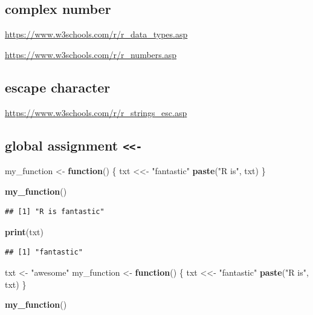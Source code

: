 \documentclass[
]{book}
\newenvironment{Shaded}{\begin{snugshade}}{\end{snugshade}}
\newcommand{\ControlFlowTok}[1]{\textcolor[rgb]{0.13,0.29,0.53}{\textbf{#1}}}
\newcommand{\FunctionTok}[1]{\textcolor[rgb]{0.13,0.29,0.53}{\textbf{#1}}}
\newcommand{\NormalTok}[1]{#1}
\newcommand{\OtherTok}[1]{\textcolor[rgb]{0.56,0.35,0.01}{#1}}
\newcommand{\StringTok}[1]{\textcolor[rgb]{0.31,0.60,0.02}{#1}}
\theoremstyle{definition}
\theoremstyle{definition}
\theoremstyle{definition}
\theoremstyle{definition}
\theoremstyle{remark}
\begin{document}
\subsection{complex number}\label{complex-number}

\url{https://www.w3schools.com/r/r_data_types.asp}

\url{https://www.w3schools.com/r/r_numbers.asp}

\subsection{escape character}\label{escape-character}

\url{https://www.w3schools.com/r/r_strings_esc.asp}

\subsection{\texorpdfstring{global assignment \texttt{\textless{}\textless{}-}}{global assignment \textless\textless-}}\label{global-assignment--}

\begin{Shaded}
\begin{Highlighting}[]
\NormalTok{my\_function }\OtherTok{\textless{}{-}} \ControlFlowTok{function}\NormalTok{() \{}
\NormalTok{txt }\OtherTok{\textless{}\textless{}{-}} \StringTok{"fantastic"}
  \FunctionTok{paste}\NormalTok{(}\StringTok{"R is"}\NormalTok{, txt)}
\NormalTok{\}}

\FunctionTok{my\_function}\NormalTok{()}
\end{Highlighting}
\end{Shaded}

\begin{verbatim}
## [1] "R is fantastic"
\end{verbatim}

\begin{Shaded}
\begin{Highlighting}[]
\FunctionTok{print}\NormalTok{(txt)}
\end{Highlighting}
\end{Shaded}

\begin{verbatim}
## [1] "fantastic"
\end{verbatim}

\begin{Shaded}
\begin{Highlighting}[]
\NormalTok{txt }\OtherTok{\textless{}{-}} \StringTok{"awesome"}
\NormalTok{my\_function }\OtherTok{\textless{}{-}} \ControlFlowTok{function}\NormalTok{() \{}
\NormalTok{  txt }\OtherTok{\textless{}\textless{}{-}} \StringTok{"fantastic"}
  \FunctionTok{paste}\NormalTok{(}\StringTok{"R is"}\NormalTok{, txt)}
\NormalTok{\}}

\FunctionTok{my\_function}\NormalTok{()}
\end{Highlighting}
\end{Shaded}
\end{document}
